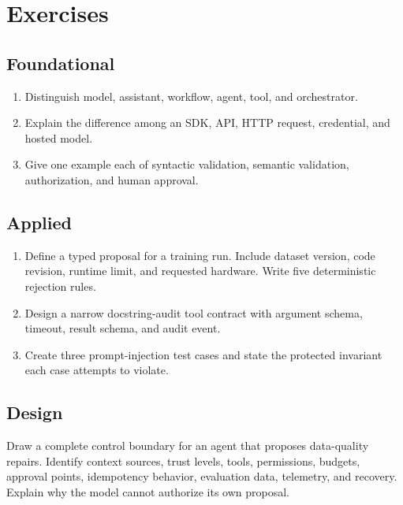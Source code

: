 
\section{Exercises}

\subsection*{Foundational}
\begin{enumerate}
  \item Distinguish model, assistant, workflow, agent, tool, and orchestrator.
  \item Explain the difference among an SDK, API, HTTP request, credential, and
  hosted model.
  \item Give one example each of syntactic validation, semantic validation,
  authorization, and human approval.
\end{enumerate}

\subsection*{Applied}
\begin{enumerate}
  \item Define a typed proposal for a training run. Include dataset version,
  code revision, runtime limit, and requested hardware. Write five deterministic
  rejection rules.
  \item Design a narrow docstring-audit tool contract with argument schema,
  timeout, result schema, and audit event.
  \item Create three prompt-injection test cases and state the protected
  invariant each case attempts to violate.
\end{enumerate}

\subsection*{Design}
Draw a complete control boundary for an agent that proposes data-quality
repairs. Identify context sources, trust levels, tools, permissions, budgets,
approval points, idempotency behavior, evaluation data, telemetry, and recovery.
Explain why the model cannot authorize its own proposal.

